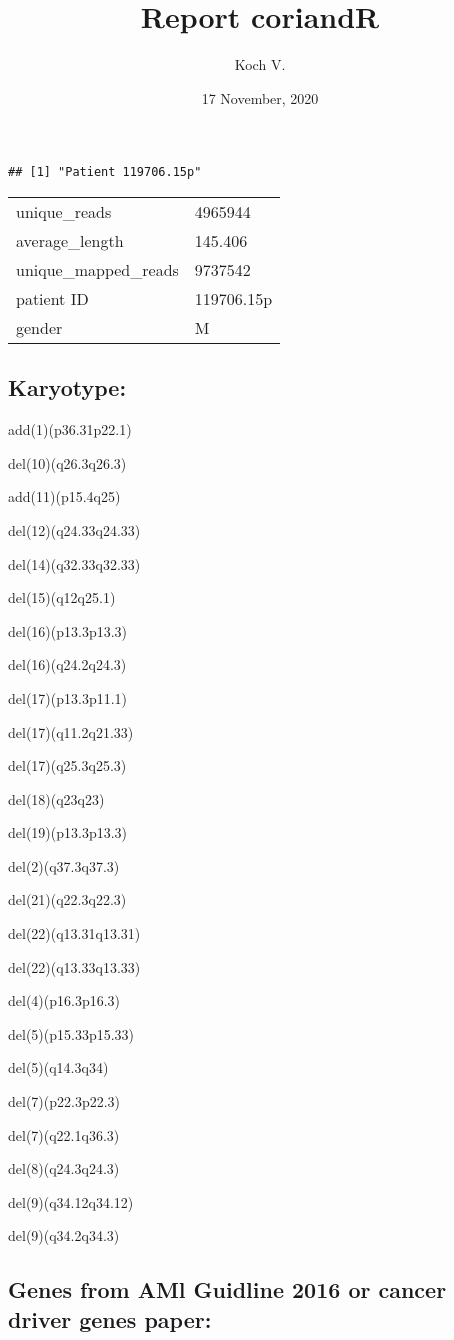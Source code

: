 \documentclass[]{article}
\title{Report coriandR}
\author{Koch V.}
\date{17 November, 2020}
\begin{document}
\maketitle

\begin{verbatim}
## [1] "Patient 119706.15p"
\end{verbatim}

\begin{longtable}[]{@{}ll@{}}
\toprule
\endhead
unique\_reads & 4965944\tabularnewline
average\_length & 145.406\tabularnewline
unique\_mapped\_reads & 9737542\tabularnewline
patient ID & 119706.15p\tabularnewline
gender & M\tabularnewline
\bottomrule
\end{longtable}

\hypertarget{karyotype}{%
\subsection{Karyotype:}\label{karyotype}}

add(1)(p36.31p22.1)

del(10)(q26.3q26.3)

add(11)(p15.4q25)

del(12)(q24.33q24.33)

del(14)(q32.33q32.33)

del(15)(q12q25.1)

del(16)(p13.3p13.3)

del(16)(q24.2q24.3)

del(17)(p13.3p11.1)

del(17)(q11.2q21.33)

del(17)(q25.3q25.3)

del(18)(q23q23)

del(19)(p13.3p13.3)

del(2)(q37.3q37.3)

del(21)(q22.3q22.3)

del(22)(q13.31q13.31)

del(22)(q13.33q13.33)

del(4)(p16.3p16.3)

del(5)(p15.33p15.33)

del(5)(q14.3q34)

del(7)(p22.3p22.3)

del(7)(q22.1q36.3)

del(8)(q24.3q24.3)

del(9)(q34.12q34.12)

del(9)(q34.2q34.3)

\hypertarget{genes-from-aml-guidline-2016-or-cancer-driver-genes-paper}{%
\subsection{Genes from AMl Guidline 2016 or cancer driver genes
paper:}\label{genes-from-aml-guidline-2016-or-cancer-driver-genes-paper}}
\end{document}

